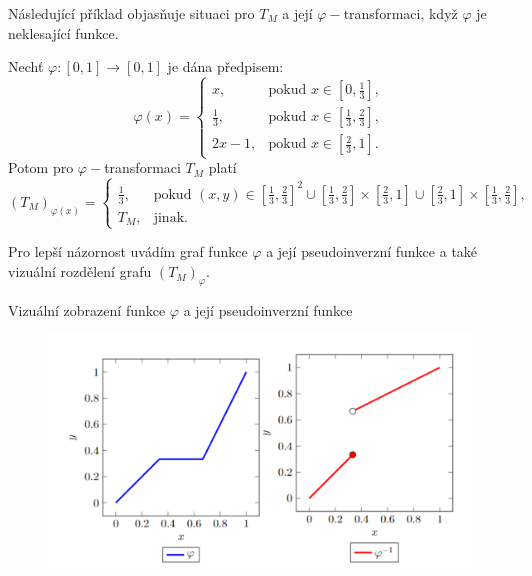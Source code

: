   N\'asleduj\'ic\'i p\v r\'iklad objas\v nuje situaci pro $T_M$ a jej\'i $\varphi-$transformaci, kdy\v z $\varphi$ je neklesaj\'ic\'i funkce. 
\begin{example}
\label{sub: fi}
Nech\v t $\varphi:[0,1] \to [0,1]$ je d\'ana p\v redpisem:    
 $$\varphi(x) = \begin{cases} x, & \mbox {pokud } x \in [0,\frac{1}{3}],
    \\ \frac{1}{3}, & \mbox {pokud } x \in [\frac{1}{3}, \frac{2}{3}],\\
    2x - 1, & \mbox {pokud } x \in [\frac{2}{3}, 1].
    \end{cases}$$
Potom pro $\varphi-$transformaci $T_M$ plat\'i
$$(T_M)_{\varphi(x)} = \begin{cases} \frac{1}{3}, & \mbox {pokud } (x, y) \in [\frac{1}{3},\frac{2}{3}]^2 \cup [\frac{1}{3}, \frac{2}{3}] \times [\frac{2}{3}, 1] \cup [\frac{2}{3}, 1] \times [\frac{1}{3}, \frac{2}{3}],\\
    T_M, & \mbox {jinak.}
    \end{cases}$$
\end{example}
Pro lep\v s\'i n\'azornost uv\'ad\'im graf  funkce $\varphi$ a jej\'i pseudoinverzn\'i funkce a tak\'e vizu\'aln\'i rozd\v elen\'i grafu $\left(T_M\right)_\varphi.$\\
\begin{graph}
    Vizu\' aln\' i zobrazení funkce $\varphi$ a jej\'i pseudoinverzn\'i funkce
\begin{figure}[H]
                \hspace{-1cm}
                \includegraphics[scale=0.75]{template-fig/phi_transform.pdf}
                \centering
            \end{figure}
\end{graph}

